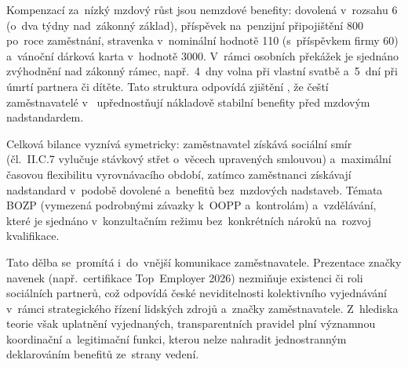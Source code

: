 Kompenzací za~nízký mzdový růst jsou nemzdové benefity: dovolená v~rozsahu \SI{6}{\week} (o~dva týdny nad~zákonný základ), příspěvek na~penzijní připojištění \SI{800}{\czk} po~roce zaměstnání, stravenka v~nominální hodnotě \SI{110}{\czk} (s~příspěvkem firmy \SI{60}{\czk}) a~vánoční dárková karta v~hodnotě \SI{3000}{\czk}. V~rámci osobních překážek je sjednáno zvýhodnění nad zákonný rámec, např.~4~dny volna při vlastní svatbě a~5~dní při úmrtí partnera či dítěte. Tato struktura odpovídá zjištění , že čeští zaměstnavatelé v~ upřednostňují nákladově stabilní benefity před mzdovým nadstandardem.~\cite{CMKOS_ZpravaKV2025}\par

Celková bilance vyznívá symetricky: zaměstnavatel získává sociální smír (čl.~II.C.7 vylučuje stávkový střet o~věcech upravených smlouvou) a~maximální časovou flexibilitu vyrovnávacího období, zatímco zaměstnanci získávají nadstandard v~podobě dovolené a~benefitů bez~mzdových nadstaveb. Témata \acs{BOZP} (vymezená podrobnými závazky k~OOPP a~kontrolám) a~vzdělávání, které je sjednáno v~konzultačním režimu bez~konkrétních nároků na~rozvoj kvalifikace.~\cite{PennyMarket_KS2026}\par

Tato dělba se~promítá i~do~vnější komunikace zaměstnavatele. Prezentace značky navenek (např.~certifikace Top~Employer 2026) nezmiňuje existenci  či roli sociálních partnerů, což odpovídá české neviditelnosti kolektivního vyjednávání v~rámci strategického řízení lidských zdrojů a~značky zaměstnavatele. Z~hlediska teorie  však uplatnění vyjednaných, transparentních pravidel plní významnou koordinační a~legitimační funkci, kterou nelze nahradit jednostranným deklarováním benefitů ze~strany vedení.~\cite{penny_top_employer_2026}\par
